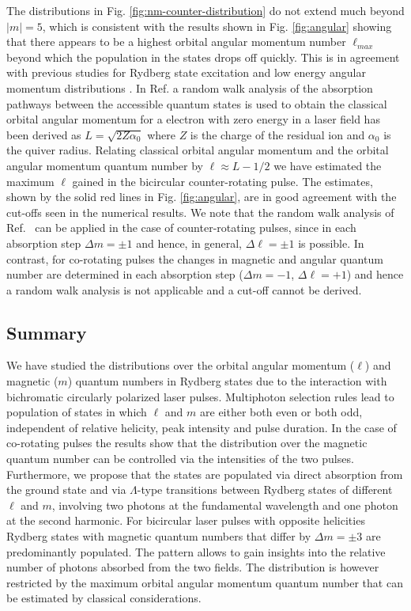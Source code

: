 The distributions in Fig. \ref{fig:nm-counter-distribution} do not extend much beyond $|m| = 5$, which is consistent with the results shown in Fig. \ref{fig:angular} showing that there appears to be a highest orbital angular momentum number $\ell_{max}$ beyond which the population in the states drops off quickly. This is in agreement with previous studies for Rydberg state excitation \cite{piraux2017,venzke2018_ryd} and low energy angular momentum distributions \cite{arbo2008}. In Ref. \cite{arbo2008} a random walk analysis of the absorption pathways between the accessible quantum states is used to obtain the classical orbital angular momentum for a electron with zero energy in a laser field has been derived as $L = \sqrt{2Z\alpha_0}$
where $Z$ is the charge of the residual ion and $\alpha_0$ is the quiver radius. Relating classical orbital angular momentum and the orbital angular momentum quantum number by $\ell \approx L - 1/2$ we have estimated the maximum $\ell$ gained in the bicircular counter-rotating pulse. The estimates, shown by the solid red lines in Fig. \ref{fig:angular}, are in good agreement with the cut-offs seen in the numerical results. We note that the random walk analysis of Ref.\ \cite{arbo2008} can be applied in the case of counter-rotating pulses, since in each absorption step $\Delta m = \pm 1$ and hence, in general, $\Delta \ell = \pm 1$ is possible. In contrast, for co-rotating pulses the changes in magnetic and angular quantum number are determined in each absorption step ($\Delta m = -1$, $\Delta \ell = +1$) and hence a random walk analysis is not applicable and a cut-off cannot be derived.

\subsection{Summary}
\label{sub:summary_bi_circ_ryd}

We have studied the distributions over the orbital angular momentum ($\ell$) and magnetic ($m$) quantum numbers in Rydberg states due to the interaction with bichromatic circularly polarized laser pulses. Multiphoton selection rules lead to population of states in which $\ell$ and $m$ are either both even or both odd, independent of relative helicity, peak intensity and pulse duration. In the case of co-rotating pulses the results show that the distribution over the magnetic quantum number can be controlled via the intensities of the two pulses. Furthermore, we propose that the states are populated via direct absorption from the ground state and via $\Lambda$-type transitions between Rydberg states of different $\ell$ and $m$, involving two photons at the fundamental wavelength and one photon at the second harmonic. For bicircular laser pulses with opposite helicities Rydberg states with magnetic quantum numbers that differ by $\Delta m = \pm 3$ are predominantly populated. The pattern allows to gain insights into the relative number of photons absorbed from the two fields. The distribution is however restricted by the maximum orbital angular momentum quantum number that can be estimated by classical considerations.

